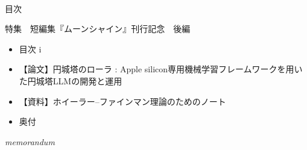 \documentclass[10pt, a5paper, twoside]{jsarticle}
\theoremstyle{definition}
\begin{document}
	\begin{center}

	~ %

		\Large{目次}

		\vspace{5mm}

		\normalsize{特集　短編集『ムーンシャイン』刊行記念　後編}

	\end{center}

	\begin{itemize}

		\item 目次 \dotfill i

			\vspace{3mm}

		\item 【論文】円城塔のローラ : Apple silicon専用機械学習フレームワークを用いた円城塔LLMの開発と運用 

			\vspace{3mm}

		\item 【資料】ホイーラー--ファインマン理論のためのノート 

			\vspace{3mm}

		\item 奥付 

	\end{itemize}

	\vfill


	\newpage

	\begin{center}

		\Large{\textit{memorandum}}

	\end{center}
\end{document}
